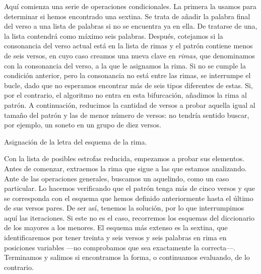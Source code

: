 Aquí comienza una serie de operaciones condicionales. La primera la usamos para determinar si hemos encontrado una sextina. Se trata de añadir la palabra final del verso a una lista de palabras si no se encuentra ya en ella. De tratarse de una, la lista contendrá como máximo seis palabras. Después, cotejamos si la consonancia del verso actual está en la lista de rimas y el patrón contiene menos de seis versos, en cuyo caso creamos una nueva clave en \textit{rimas}, que denominamos con la consonancia del verso, a la que le asignamos la rima. Si no se cumple la condición anterior, pero la consonancia no está entre las rimas, se interrumpe el bucle, dado que no esperamos encontrar más de seis tipos diferentes de estas. Si, por el contrario, el algoritmo no entra en esta bifurcación, añadimos la rima al patrón. A continuación, reducimos la cantidad de versos a probar aquella igual al tamaño del patrón y las de menor número de versos: no tendría sentido buscar, por ejemplo, un soneto en un grupo de diez versos.

\begin{algorithm}[!ht]
	\caption{Asignación de la letra del esquema de la rima.}\label{list:stanzasesq}
\end{algorithm}

Con la lista de posibles estrofas  reducida, empezamos a probar sus elementos. Antes de comenzar, extraemos la rima que sigue a las que estamos analizando. Ante de las operaciones generales, buscamos un aquelindo, como un caso particular. Lo hacemos verificando que el patrón tenga más de cinco versos y que se corresponda con el esquema que hemos definido anteriormente hasta el último de sus versos pares. De ser así, tenemos la solución, por lo que interrumpimos aquí las iteraciones. Si este no es el caso, recorremos los esquemas del diccionario de los mayores a los menores. El esquema más extenso es la sextina, que identificaremos por tener treinta y seis versos y seis palabras en rima en posiciones variables —no comprobamos que sea exactamente la correcta—. Terminamos y salimos si encontramos la forma, o continuamos evaluando, de lo contrario.

